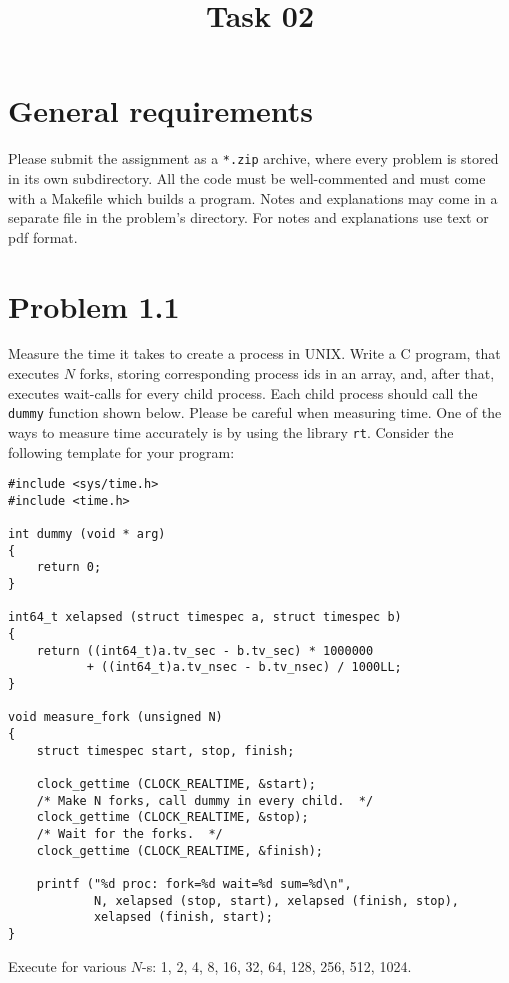 \documentclass[a4paper,10pt]{scrartcl}
\title{ 
    Task 02
}
\date{}
\begin{document}
    \maketitle
    \thispagestyle{fancy}

    \section*{General requirements}
    Please submit the assignment as a \verb|*.zip| archive, where every
    problem is stored in its own subdirectory.  All the code must be
    well-commented and must come with a Makefile which builds a program.
    Notes and explanations may come in a separate file in the problem's
    directory.  For notes and explanations use text or pdf format.

 
    \section{Problem 1.1}
    Measure the time it takes to create a process in UNIX.  Write a
    C program, that executes $N$ forks, storing corresponding process
    ids in an array, and, after that, executes wait-calls for every child process.
    Each child process should call the \verb|dummy| function shown below.
    Please be
    careful when measuring time.  One of the ways to measure time
    accurately is by using the library \verb|rt|.  Consider the following
    template for your program:
    \begin{verbatim}
#include <sys/time.h>
#include <time.h>

int dummy (void * arg)
{
    return 0;
}

int64_t xelapsed (struct timespec a, struct timespec b)
{
    return ((int64_t)a.tv_sec - b.tv_sec) * 1000000
           + ((int64_t)a.tv_nsec - b.tv_nsec) / 1000LL;
}

void measure_fork (unsigned N)
{
    struct timespec start, stop, finish;

    clock_gettime (CLOCK_REALTIME, &start);
    /* Make N forks, call dummy in every child.  */
    clock_gettime (CLOCK_REALTIME, &stop);
    /* Wait for the forks.  */
    clock_gettime (CLOCK_REALTIME, &finish);

    printf ("%d proc: fork=%d wait=%d sum=%d\n",
            N, xelapsed (stop, start), xelapsed (finish, stop),
            xelapsed (finish, start);
}
    \end{verbatim}
    Execute for various $N$-s: 1, 2, 4, 8, 16, 32, 64, 128, 256, 512,
    1024.
    
\end{document}
